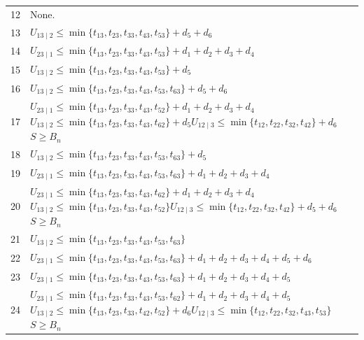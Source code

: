 \documentclass[a4paper,11pt]{amsart}
\numberwithin{equation}{section}
\theoremstyle{definition}
\theoremstyle{remark}
\begin{document}
{\begin{longtable}{@{}r>{\raggedright\arraybackslash}p{12.9cm}@{}}
12 & None.\\[3pt]
13 & \(U_{13\mid 2}\leq \min\{t_{13},t_{23},t_{33},t_{43},t_{53}\}+d_{5}+d_{6}\)\\[3pt]
14 & \(U_{23\mid 1}\leq \min\{t_{13},t_{23},t_{33},t_{43},t_{53}\}+d_{1}+d_{2}+d_{3}+d_{4}\)\\[3pt]
15 & \(U_{13\mid 2}\leq \min\{t_{13},t_{23},t_{33},t_{43},t_{53}\}+d_{5}\)\\[3pt]
16 & \(U_{13\mid 2}\leq \min\{t_{13},t_{23},t_{33},t_{43},t_{53},t_{63}\}+d_{5}+d_{6}\)\\[3pt]
17 & \(U_{23\mid 1}\leq \min\{t_{13},t_{23},t_{33},t_{43},t_{52}\}+d_{1}+d_{2}+d_{3}+d_{4}\)\newline \(U_{13\mid 2}\leq \min\{t_{13},t_{23},t_{33},t_{43},t_{62}\}+d_{5}\)\newline \(U_{12\mid 3}\leq \min\{t_{12},t_{22},t_{32},t_{42}\}+d_{6}\)\newline \(S\geq B_n\)\\[3pt]
18 & \(U_{13\mid 2}\leq \min\{t_{13},t_{23},t_{33},t_{43},t_{53},t_{63}\}+d_{5}\)\\[3pt]
19 & \(U_{23\mid 1}\leq \min\{t_{13},t_{23},t_{33},t_{43},t_{53},t_{63}\}+d_{1}+d_{2}+d_{3}+d_{4}\)\\[3pt]
20 & \(U_{23\mid 1}\leq \min\{t_{13},t_{23},t_{33},t_{43},t_{62}\}+d_{1}+d_{2}+d_{3}+d_{4}\)\newline \(U_{13\mid 2}\leq \min\{t_{13},t_{23},t_{33},t_{43},t_{52}\}\)\newline \(U_{12\mid 3}\leq \min\{t_{12},t_{22},t_{32},t_{42}\}+d_{5}+d_{6}\)\newline \(S\geq B_n\)\\[3pt]
21 & \(U_{13\mid 2}\leq \min\{t_{13},t_{23},t_{33},t_{43},t_{53},t_{63}\}\)\\[3pt]
22 & \(U_{23\mid 1}\leq \min\{t_{13},t_{23},t_{33},t_{43},t_{53},t_{63}\}+d_{1}+d_{2}+d_{3}+d_{4}+d_{5}+d_{6}\)\\[3pt]
23 & \(U_{23\mid 1}\leq \min\{t_{13},t_{23},t_{33},t_{43},t_{53},t_{63}\}+d_{1}+d_{2}+d_{3}+d_{4}+d_{5}\)\\[3pt]
24 & \(U_{23\mid 1}\leq \min\{t_{13},t_{23},t_{33},t_{43},t_{53},t_{62}\}+d_{1}+d_{2}+d_{3}+d_{4}+d_{5}\)\newline \(U_{13\mid 2}\leq \min\{t_{13},t_{23},t_{33},t_{42},t_{52}\}+d_{6}\)\newline \(U_{12\mid 3}\leq \min\{t_{12},t_{22},t_{32},t_{43},t_{53}\}\)\newline \(S\geq B_n\)\\[3pt]

\end{longtable}}
\end{document}
